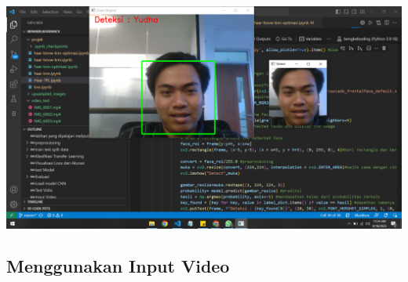 \documentclass[
  letterpaper,
  DIV=11,
  numbers=noendperiod]{scrreprt}
\begin{document}
\includegraphics{Asset/test_tflearning.png}

\hypertarget{menggunakan-input-video-1}{%
\subsection*{Menggunakan Input Video}\label{menggunakan-input-video-1}}
\end{document}
